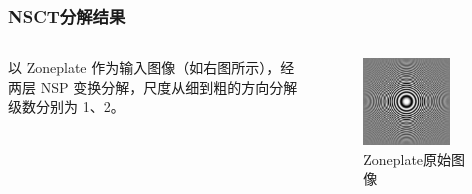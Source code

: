 \documentclass[10pt,aspectratio=43,mathserif]{beamer}
\begin{document}
\begin{frame}
		  \frametitle{\textbf{NSCT分解结果}}
            \begin{columns}
                \footnotesize
以 Zoneplate 作为输入图像（如右图所示），经两层 NSP
变换分解，尺度从细到粗的方向分解级数分别为 1、2。

                \begin{figure}[!t]
                    \centering
                    \includegraphics[width=0.8\textwidth]{./figures/nsct/Zoneplate.png}
                    \caption{Zoneplate原始图像}
                \end{figure}
        \end{columns}
    \end{frame}
\end{document}
